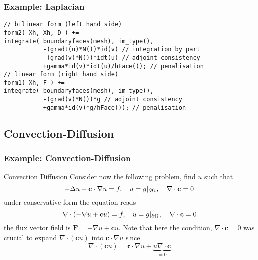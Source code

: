 \subsubsection[containsverbatim]{Example: Laplacian}
  \begin{lstlisting}
// bilinear form (left hand side)
form2( Xh, Xh, D ) +=
integrate( boundaryfaces(mesh), im_type(),
           -(gradt(u)*N())*id(v) // integration by part
           -(grad(v)*N())*idt(u) // adjoint consistency
           +gamma*id(v)*idt(u)/hFace()); // penalisation
// linear form (right hand side)
form1( Xh, F ) +=
integrate( boundaryfaces(mesh), im_type(),
           -(grad(v)*N())*g // adjoint consistency
           +gamma*id(v)*g/hFace()); // penalisation
  \end{lstlisting}


\subsection{Convection-Diffusion}
\subsubsection{Example: Convection-Diffusion}
  \begin{remark}{Convection Diffusion}
    Consider now the following problem, find $u$ such that
    \begin{equation}
      \label{notes:eq:45}
      -\Delta u + \mathbf{c} \cdot \nabla u  = f,\quad u = g|_{\partial {\ensuremath{\Omega^{}}}},\quad \nabla \cdot \mathbf{c} = 0
    \end{equation}
    under conservative form the equation reads
    \begin{equation}
      \label{notes:eq:2}
      \nabla \cdot ( -\nabla u + \mathbf{c} u ) = f,\quad u = g|_{\partial {\ensuremath{\Omega^{}}}},\quad \nabla \cdot \mathbf{c} = 0
    \end{equation}
    the flux vector field is $\mathbf{F}=-\nabla u + \mathbf{c} u$. Note that
    here the condition, $\nabla \cdot \mathbf{c} = 0$ was crucial to
    expand $\nabla \cdot (\mathbf{c} u )$ into $\mathbf{c} \cdot \nabla u$ since
    \begin{equation}
      \label{notes:eq:3}
      \nabla \cdot (\mathbf{c} u ) = \mathbf{c} \cdot \nabla u + \underbrace{u \nabla \cdot \mathbf{c}}_{=0}
    \end{equation}
  \end{remark}


